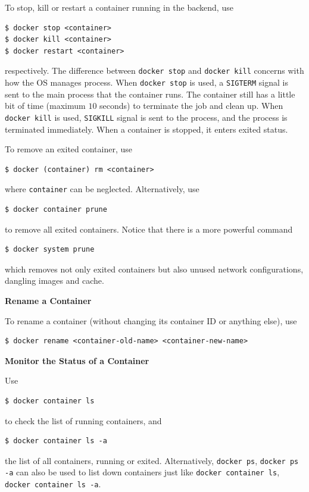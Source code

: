 To stop, kill or restart a container running in the backend, use
\begin{lstlisting}
$ docker stop <container>
$ docker kill <container>
$ docker restart <container>
\end{lstlisting}
respectively. The difference between \verb|docker stop| and \verb|docker kill| concerns with how the OS manages process. When \verb|docker stop| is used, a  \verb|SIGTERM| signal is sent to the main process that the container runs. The container still has a little bit of time (maximum $10$ seconds) to terminate the job and clean up. When \verb|docker kill| is used, \verb|SIGKILL| signal is sent to the process, and the process is terminated immediately. When a container is stopped, it enters exited status.

To remove an exited container, use
\begin{lstlisting}
$ docker (container) rm <container>
\end{lstlisting}
where \verb|container| can be neglected. Alternatively, use
\begin{lstlisting}
$ docker container prune
\end{lstlisting}
to remove all exited containers. Notice that there is a more powerful command
\begin{lstlisting}
$ docker system prune
\end{lstlisting}
which removes not only exited containers but also unused network configurations, dangling images and cache.

\vspace{0.1in}
\noindent \textbf{Rename a Container}
\vspace{0.1in}

To rename a container (without changing its container ID or anything else), use
\begin{lstlisting}
$ docker rename <container-old-name> <container-new-name>
\end{lstlisting}

\vspace{0.1in}
\noindent \textbf{Monitor the Status of a Container}
\vspace{0.1in}

Use
\begin{lstlisting}
$ docker container ls
\end{lstlisting}
to check the list of running containers, and
\begin{lstlisting}
$ docker container ls -a
\end{lstlisting}
the list of all containers, running or exited. Alternatively, \verb|docker ps|, \verb|docker ps -a| can also be used to list down containers just like \verb|docker container ls|, \verb|docker container ls -a|.

